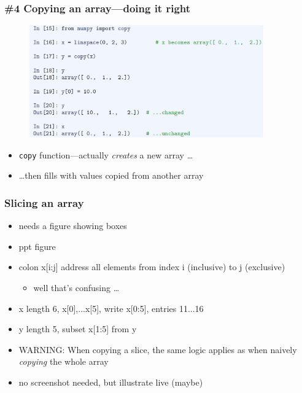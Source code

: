 \documentclass[14pt]{beamer}
\begin{document}
\begin{frame}[fragile]

\frametitle{\#4 Copying an array---doing it right}

\begin{figure}[ht]
	\centering
	\includegraphics[width=0.9\textwidth]{figures/LLp51a}
\end{figure}

\vspace*{-5mm}

\begin{itemize}
	\item \texttt{copy} function---actually \emph{creates} a new array \ldots
	\item[] \ldots then fills with values copied from another array
\end{itemize}

\end{frame}


\begin{frame}[fragile]

\frametitle{Slicing an array}

\begin{itemize}
	\item needs a figure showing boxes
	\item ppt figure
	\item colon x[i:j] address all elements from index i (inclusive) to j (exclusive)
		\begin{itemize}
			\item well that's confusing \ldots
		\end{itemize}
	\item x length 6, x[0],...x[5], write x[0:5], entries 11...16
	\item y length 5, subset x[1:5]  from y
	\item WARNING: When copying a slice, the same logic applies as when naively \emph{copying} the whole array
	\item no screenshot needed, but illustrate live (maybe)
\end{itemize}

\end{frame}
\end{document}
